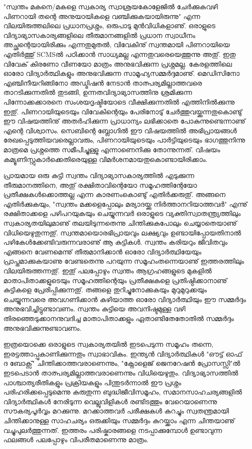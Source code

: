 "സ്വന്തം മകനെ/മകളെ സ്വകാര്യ സ്വാശ്രയകോളേജില്‍ ചേര്‍ക്കുകവഴി പിണറായി തന്റെ അനുയായികളെ വഞ്ചിക്കുകയായിരുന്നു" എന്ന വിലയിരുത്തലിലെ പ്രധാനപ്രശ്നം, ഒരുപാടു മുന്‍വിധികളാണു്. ഒരാളുടെ വിദ്യാഭ്യാസകാര്യങ്ങളിലെ തീരുമാനങ്ങളില്‍ പ്രധാന സ്വാധീനം അച്ഛന്റെയായിരിക്കും എന്നതുമുതല്‍, വിവേകിനു് സ്വന്തമായി പിണറായിയെ എതിര്‍ത്തു് SCMSല്‍ പഠിക്കാന്‍ സാധ്യമല്ല എന്നതുവരെയെത്തുന്നു അതു്. ഇതു വിവേക് കിരണോ വീണയോ മാത്രം അനുഭവിക്കുന്ന പ്രശ്നമല്ല. കേരളത്തിലെ ഓരോ വിദ്യാര്‍ത്ഥികളും അനുഭവിക്കുന്ന സാമൂഹ്യസമ്മര്‍ദ്ദമാണു്. മെഡിസിനോ എഞ്ചിനീയറിങ്ങിനോ അഡ്മിഷന്‍ നേടാന്‍ താത്പര്യമില്ലാത്തവരെ താറടിക്കുന്നതില്‍ തുടങ്ങി, ഉന്നതവിദ്യാഭ്യാസത്തിനു ശ്രമിക്കുന്ന പിന്നോക്കക്കാരനെ സംശയദൃഷ്ടിയോടെ വീക്ഷിക്കുന്നതില്‍ എത്തിനില്‍ക്കുന്നു ഇതു്. പിണറായിയുടെയും വിവേകിന്റെയും പേരിനോടു് ചേര്‍ത്തുവയ്ക്കുന്നതുകൊണ്ടു് ഈ വിഷയത്തിനു് അതര്‍ഹിക്കുന്ന പ്രാധാന്യം ലഭിക്കാതെ പോകുന്നുണ്ടെന്നാണു് എന്റെ വിശ്വാസം. സെബിന്റെ ബ്ലോഗില്‍ ഈ വിഷയത്തില്‍ അഭിപ്രായങ്ങള്‍ രേഖപ്പെടുത്തിയവരെല്ലാവരും, പിണറായിയുടെയും പാര്‍ട്ടിയുടെയും ഭാഗത്തുനിന്നു മാത്രമെ പ്രശ്നത്തെ സമീപിച്ചുള്ളു എന്നാണെനിക്കു തോന്നുന്നത്. വിഷയം കമ്യൂണിസ്റ്റുകാര്‍ക്കെതിരെയുള്ള വിമര്‍ശനമായതുകൊണ്ടായിരിക്കാം.

പ്രായമായ ഒരു കുട്ടി സ്വന്തം വിദ്യാഭ്യാസകാര്യത്തില്‍ എടുക്കുന്ന തീരുമാനത്തിനെ, അതു് രക്ഷിതാവിന്റെയോ സമൂഹത്തിന്റേയോ പ്രതീക്ഷകള്‍ക്കൊത്തല്ല എന്ന കാരണംകൊണ്ടു് എതിര്‍ക്കരുതു്. അങ്ങനെ എതിര്‍ക്കുകയും, "സ്വന്തം മക്കളെപ്പോലും മര്യാദയ്ക്കു നിര്‍ത്താനറിയാത്തവര്‍" എന്നു് രക്ഷിതാക്കളെ പഴിപറയുകയും ചെയ്യുന്നവര്‍ ഒരാളുടെ വ്യക്തിസ്വാതന്ത്ര്യത്തിലും സ്വകാര്യതയിലുമാണു് തലയിടുന്നതെന്നു ചിന്തിക്കുകപോലും ചെയ്യാതെയാണു് വിധിയെഴുതുന്നതു്. സ്വന്തമായൊരഭിപ്രായവും ലക്ഷ്യവും ഉണ്ടായിപ്പോയതിനാല്‍ പഴികേള്‍ക്കേണ്ടിവരുന്നവരാണു് ആ കുട്ടികള്‍. സ്വന്തം കരിയറും ജീവിതവും എങ്ങനെ വേണമെന്നു് തീരുമാനിക്കാന്‍ ഓരോ വിദ്യാര്‍ത്ഥിയേയും പ്രാപ്തമാക്കുകയാണു വേണ്ടതെന്നു പറയുന്ന സമൂഹംതന്നെയാണു് ഇത്തരത്തിലും വിലയിരുത്തന്നതു്. ഇതു് പലപ്പോഴും സ്വന്തം ആഗ്രഹങ്ങളുടെ മുകളില്‍ മാതാപിതാക്കളുടെയും സമൂഹത്തിന്റെയും പ്രതീക്ഷകളെ പ്രതിഷ്ഠിക്കാനാണു് കുട്ടികളെ പ്രേരിപ്പിക്കുന്നതു്. തങ്ങളെ തുറിച്ചുനോക്കുകയും മുറുമുറുക്കയും ചെയ്യുന്നവരെ അവഗണിക്കാന്‍ കഴിയാത്ത ഓരോ വിദ്യാര്‍ത്ഥിയും ഈ സമ്മര്‍ദ്ദം അനുഭവിച്ചിട്ടുണ്ടാവണം. സ്വന്തം കുട്ടിയെ അവനിഷ്ടമുള്ള വഴി തിരഞ്ഞെടുക്കാനനുവദിച്ച മാതാപിതാക്കളും ഏതാണ്ടിതേതോതില്‍ സമ്മര്‍ദ്ദം അനുഭവിക്കുന്നുണ്ടാവണം.

ഇത്രയൊക്കെ ഒരാളുടെ സ്വകാര്യതയില്‍ ഇടപെടുന്ന സമൂഹം തന്നെ, ഇരട്ടത്താപ്പുകാണിക്കുന്നതും സ്വാഭാവികം. ഇന്ത്യന്‍ വിദ്യാര്‍ത്ഥികള്‍ "ഔട്ട് ഓഫ് ദ ബോക്സ്" ചിന്തിക്കാത്തവരാണെന്നും, "ക്നോളെജ് ജെനറേഷന്‍ പ്രോസസ്സി"ല്‍ ഇടപെടാന്‍ താത്പര്യമില്ലാത്തവരാണെന്നും വിധിയെഴുതും. വിദ്യാഭ്യാസത്തില്‍ പാശ്ചാത്യരീതികളും പ്രക്രിയകളും പിന്തുടര്‍ന്നാല്‍ ഈ പ്രശ്നം പരിഹരിക്കപ്പെടുമെന്നു കരുതുന്ന ബുദ്ധിജീവിസമൂഹം, സമാനസാഹചര്യങ്ങളില്‍ വിദ്യാര്‍ത്ഥികള്‍ നേരിടുന്ന വെല്ലുവിളികള്‍ രണ്ടിടത്തും വേറെയാണെന്നു സൗകര്യപൂര്‍വ്വം മറക്കുന്നു. മറക്കാത്തവര്‍ പരീക്ഷകള്‍ കുറച്ചും സ്വതന്ത്രമായി ചിന്തിക്കാനുള്ള സാഹചര്യം ഒരുക്കിയും സമ്മര്‍ദ്ദം കുറയ്ക്കാം എന്ന ചിന്തയാണു് വച്ചുപുലര്‍ത്തുന്നത്. ഇത്തരം പരിഷ്കാരങ്ങളെ നടപ്പാക്കുമ്പോള്‍ ഉണ്ടാവുന്ന ഫലങ്ങള്‍ പലപ്പോഴും വിപരീതമാണെന്നു മാത്രം.

